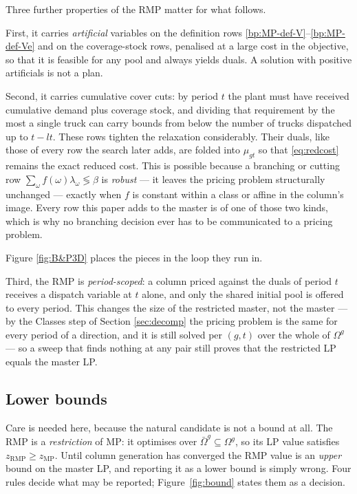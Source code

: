 Three further properties of the RMP matter for what follows.

First, it carries \emph{artificial} variables on the definition rows
\eqref{bp:MP-def-V}--\eqref{bp:MP-def-Ve} and on the coverage-stock
rows, penalised at a large cost in the objective, so that it is
feasible for any pool and always yields duals. A solution with
positive artificials is not a plan.

Second, it carries cumulative cover cuts: by period $t$ the plant must
have received cumulative demand plus coverage stock, and dividing that
requirement by the most a single truck can carry bounds from below the
number of trucks dispatched up to $t-lt$. These rows tighten the
relaxation considerably. Their duals, like those of every row the
search later adds, are folded into $\mu_{gt}$ so that
\eqref{eq:redcost} remains the exact reduced cost. This is possible
because a branching or cutting row $\sum_{\omega}f(\omega)\lambda_{\omega}
\lessgtr \beta$ is \emph{robust} --- it leaves the pricing problem
structurally unchanged --- exactly when $f$ is constant within a class
or affine in the column's image. Every row this paper adds to the
master is of one of those two kinds, which is why no branching
decision ever has to be communicated to a pricing problem.

Figure \ref{fig:B&P3D} places the pieces in the loop they run in.



Third, the RMP is \emph{period-scoped}: a column priced against the
duals of period $t$ receives a dispatch variable at $t$ alone, and only
the shared initial pool is offered to every period. This changes the
size of the restricted master, not the master --- by the Classes step of
Section \ref{sec:decomp} the pricing problem is the same for every
period of a direction, and it is still solved per $(g,t)$ over the
whole of $\Omega^{g}$ --- so a sweep that finds nothing at any pair
still proves that the restricted LP equals the master LP.

\subsection{Lower bounds}
\label{sec:bounds}

Care is needed here, because the natural candidate is not a bound at
all. The RMP is a \emph{restriction} of MP: it optimises over
$\bar\Omega^{g}\subseteq\Omega^{g}$, so its LP value satisfies
$z_{\mathrm{RMP}}\ge z_{\mathrm{MP}}$. Until column generation has
converged the RMP value is an \emph{upper} bound on the master LP, and
reporting it as a lower bound is simply wrong. Four rules decide what
may be reported; Figure~\ref{fig:bound} states them as a decision.

